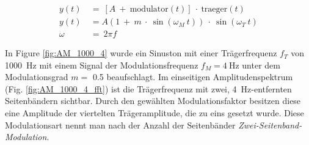 \begin{align}
y(t)\ &=\ \left[A\ +\ \mathrm{modulator}(t) \right]\ \cdot\ \mathrm{traeger}(t) \label{eq:am} \\
    y(t) &= A (1\ +\ m\ \cdot\ \sin(\omega_M\ t))\ \cdot\ \sin(\omega_T\ t)\\
    \omega\ &=\ 2\pi f
\end{align}

In Figure \ref{fig:AM_1000_4} wurde ein Sinuston mit einer Trägerfrequenz $f_T$ von \SI{1000}{\Hz} mit einem Signal der Modulationsfrequenz $f_M =  \SI{4}{\Hz}$ unter dem Modulationsgrad $m =$ 0.5 beaufschlagt. Im einseitigen Amplitudenspektrum (Fig. \ref{fig:AM_1000_4_fft}) ist die Trägerfrequenz mit zwei, \SI{4}{\Hz}-entfernten Seitenbändern sichtbar. Durch den gewählten Modulationsfaktor besitzen diese eine Amplitude der viertelten Trägeramplitude, die zu eins gesetzt wurde. Diese Modulationsart nennt man nach der Anzahl der Seitenbänder \textit{Zwei-Seitenband-Modulation}.

